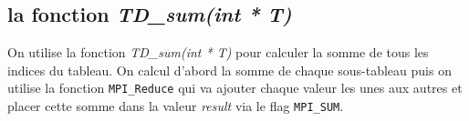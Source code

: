 \subsection*{la fonction \textit{TD\_sum(int * T)}}

On utilise la fonction \textit{TD\_sum(int * T)} pour calculer la somme de tous les indices du tableau. On calcul d'abord la somme de chaque sous-tableau puis on utilise la fonction \verb+MPI_Reduce+ qui va ajouter chaque valeur les unes aux autres et placer cette somme dans la valeur \textit{result} via le flag \verb+MPI_SUM+.


